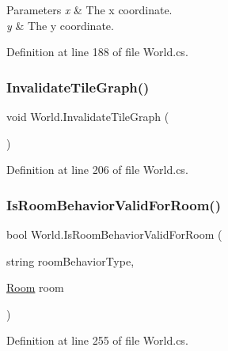 \begin{DoxyParams}{Parameters}
{\em x} & The x coordinate.\\
\hline
{\em y} & The y coordinate.\\
\hline
\end{DoxyParams}


Definition at line 188 of file World.\+cs.

\mbox{\label{class_world_a2524f9708b9e9e92804c7569ebf97ba8}} 
\subsubsection{\texorpdfstring{Invalidate\+Tile\+Graph()}{InvalidateTileGraph()}}
{\footnotesize\ttfamily void World.\+Invalidate\+Tile\+Graph (\begin{DoxyParamCaption}{ }\end{DoxyParamCaption})}



Definition at line 206 of file World.\+cs.

\mbox{\label{class_world_a4f86db4b941749f4296f1f7174405a16}} 
\subsubsection{\texorpdfstring{Is\+Room\+Behavior\+Valid\+For\+Room()}{IsRoomBehaviorValidForRoom()}}
{\footnotesize\ttfamily bool World.\+Is\+Room\+Behavior\+Valid\+For\+Room (\begin{DoxyParamCaption}\item[{string}]{room\+Behavior\+Type,  }\item[{\hyperlink{class_project_porcupine_1_1_rooms_1_1_room}{Room}}]{room }\end{DoxyParamCaption})}



Definition at line 255 of file World.\+cs.

\mbox{\label{class_world_a7c9fd81a0965117266dd01f4e872339d}} 
